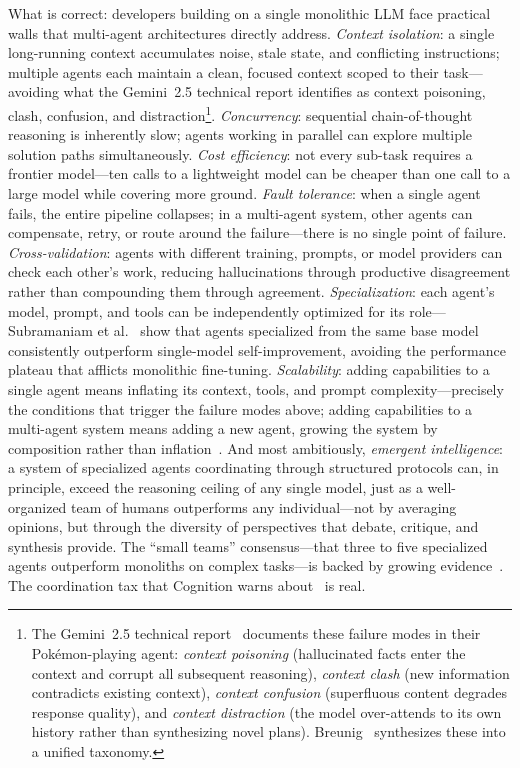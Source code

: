\documentclass{article}
\begin{document}
What is correct: developers building on a single monolithic LLM face practical walls that
multi-agent architectures directly address.  \emph{Context isolation}: a single
long-running context accumulates noise, stale state, and conflicting instructions;
multiple agents each maintain a clean, focused context scoped to their
task---avoiding what the Gemini~2.5 technical report identifies as context poisoning,
clash, confusion, and distraction\footnote{The Gemini~2.5 technical
report~\citep{gemini2025technical} documents these failure modes in their Pok\'{e}mon-playing
agent: \emph{context poisoning} (hallucinated facts enter the context and corrupt all
subsequent reasoning), \emph{context clash} (new information contradicts existing
context), \emph{context confusion} (superfluous content degrades response quality), and
\emph{context distraction} (the model over-attends to its own history rather than
synthesizing novel plans).  Breunig~\citep{breunig2025contexts} synthesizes these into a
unified taxonomy.}.
\emph{Concurrency}: sequential chain-of-thought reasoning is inherently slow; agents
working in parallel can explore multiple solution paths simultaneously.  \emph{Cost
efficiency}: not every sub-task requires a frontier model---ten calls to a lightweight
model can be cheaper than one call to a large model while covering more ground.
\emph{Fault tolerance}: when a single agent fails, the entire pipeline collapses; in a
multi-agent system, other agents can compensate, retry, or route around the failure---there
is no single point of failure.  \emph{Cross-validation}: agents with different training,
prompts, or model providers can check each other's work, reducing hallucinations through
productive disagreement rather than compounding them through agreement.
\emph{Specialization}: each agent's model, prompt, and tools can be independently optimized
for its role---Subramaniam et al.~\citep{subramaniam2025multiagent} show that agents
specialized from the same base model consistently outperform single-model self-improvement,
avoiding the performance plateau that afflicts monolithic fine-tuning.
\emph{Scalability}: adding capabilities to a single agent means inflating its context,
tools, and prompt complexity---precisely the conditions that trigger the failure modes above;
adding capabilities to a multi-agent system means adding a new agent, growing the system by
composition rather than inflation~\citep{kim2025scaling}.  And most
ambitiously, \emph{emergent intelligence}: a system of specialized agents
coordinating through structured protocols can, in principle, exceed the reasoning ceiling
of any single model, just as a well-organized team of humans outperforms any individual---not
by averaging opinions, but through the diversity of perspectives that debate, critique, and
synthesis provide.
The ``small teams'' consensus---that three to five specialized agents outperform monoliths
on complex tasks---is backed by growing
evidence~\citep{anthropic2025building, hong2024metagpt, lbmas2025}.  The coordination
tax that Cognition warns about~\citep{cognition2025dontbuild} is real.
\end{document}
